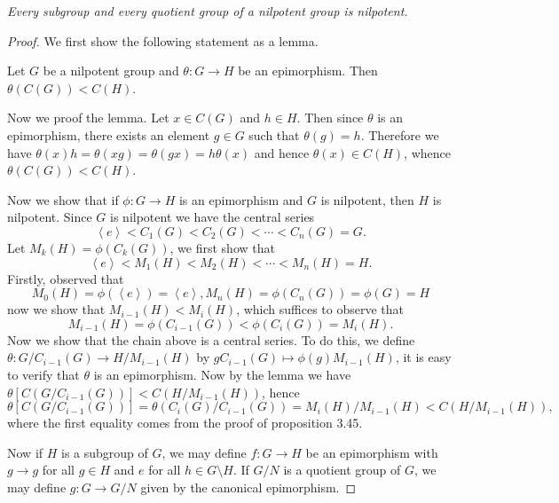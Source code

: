 \begin{problem}\em
Every subgroup and every quotient group of a nilpotent group is nilpotent.
\end{problem}
\begin{proof}
We first show the following statement as a lemma.\par
Let $G$ be a nilpotent group and $\theta:G\to H$ be an epimorphism. Then $\theta(C(G))<C(H)$.\par
Now we proof the lemma. Let $x\in C(G)$ and $h\in H$. Then since $\theta$ is an epimorphism, there exists an element $g\in G$ such that $\theta(g)=h$. Therefore we have $\theta \left( x \right) h=\theta \left( xg \right) =\theta \left( gx \right) =h\theta \left( x \right) $ and hence $\theta(x)\in C(H)$, whence $\theta(C(G))<C(H)$.\par
Now we show that if $\phi:G\to H$ is an epimorphism and $G$ is nilpotent, then $H$ is nilpotent. Since $G$ is nilpotent we have the central series 
$$
\left< e \right> <C_1\left( G \right) <C_2\left( G \right) <\cdots <C_n\left( G \right) =G.
$$
Let $M_k\left( H \right) =\phi \left( C_k\left( G \right) \right) $, we first show that 
$$
\left< e \right> <M_1\left( H \right) <M_2\left( H \right) <\cdots <M_n\left( H \right) =H.
$$
Firstly, observed that 
$$
M_0\left( H \right) =\phi \left( \left< e \right> \right) =\left< e \right> ,M_n\left( H \right) =\phi \left( C_n\left( G \right) \right) =\phi \left( G \right) =H
$$
now we show that $M_{i-1}(H)<M_i(H)$, which suffices to observe that 
$$
M_{i-1}\left( H \right) =\phi \left( C_{i-1}\left( G \right) \right) <\phi \left( C_i\left( G \right) \right) =M_i\left( H \right) .
$$
Now we show that the chain above is a central series. To do this, we define $\theta :G/C_{i-1}\left( G \right) \rightarrow H/M_{i-1}\left( H \right) $ by $gC_{i-1}\left( G \right) \mapsto \phi \left( g \right) M_{i-1}\left( H \right) $, it is easy to verify that $\theta$ is an epimorphism. Now by the lemma we have $\theta \left[ C\left( G/C_{i-1}\left( G \right) \right) \right] <C\left( H/M_{i-1}\left( H \right) \right) $, hence 
$$
\theta \left[ C\left( G/C_{i-1}\left( G \right) \right) \right] =\theta \left( C_i\left( G \right) /C_{i-1}\left( G \right) \right) =M_i\left( H \right) /M_{i-1}\left( H \right) <C\left( H/M_{i-1}\left( H \right) \right) ,
$$
where the first equality comes from the proof of proposition 3.45.\par
Now if $H$ is a subgroup of $G$, we may define $f:G\to H$ be an epimorphism with $g\to g$ for all $g\in H$ and $e$ for all $h\in G\setminus H$. If $G/N$ is a quotient group of $G$, we may define $g:G\to G/N$ given by the canonical epimorphism.
\end{proof}
